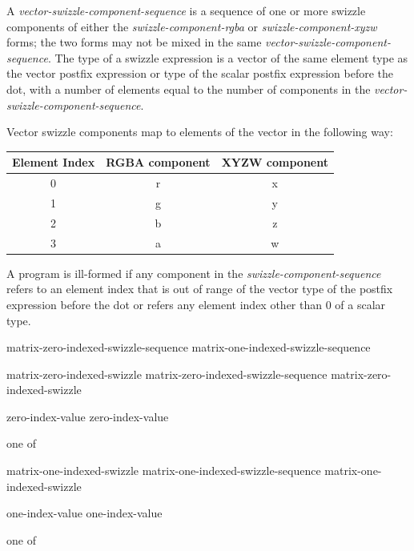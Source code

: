 \p A \textit{vector-swizzle-component-sequence} is a sequence of one or more
swizzle components of either the \textit{swizzle-component-rgba} or
\textit{swizzle-component-xyzw} forms; the two forms may not be mixed in the
same \textit{vector-swizzle-component-sequence}. The type of a swizzle
expression is a vector of the same element type as the vector postfix
expression or type of the scalar postfix expression before the dot, with a
number of elements equal to the number of components in the
\textit{vector-swizzle-component-sequence}.

\p Vector swizzle components map to elements of the vector in the following way:

\begin{center}
  \begin{tabular}{|| c | c | c ||}
    \hline
    Element Index & RGBA component & XYZW component \\
    \hline
    0 & r & x \\
    1 & g & y \\
    2 & b & z \\
    3 & a & w \\
    \hline
  \end{tabular}
\end{center}

\p A program is ill-formed if any component in the
\textit{swizzle-component-sequence} refers to an element index that is out of
range of the vector type of the postfix expression before the dot or refers any
element index other than 0 of a scalar type.

\begin{grammar}
  \br
  matrix-zero-indexed-swizzle-sequence\br
  matrix-one-indexed-swizzle-sequence\br

  \br
  matrix-zero-indexed-swizzle\br
  matrix-zero-indexed-swizzle-sequence matrix-zero-indexed-swizzle\br

  \br
   zero-index-value zero-index-value\br

   \textnormal{one of}\br
  \br

  \br
  matrix-one-indexed-swizzle\br
  matrix-one-indexed-swizzle-sequence matrix-one-indexed-swizzle\br

  \br
  \terminal{\_} one-index-value one-index-value\br

   \textnormal{one of}\br
  \br
\end{grammar}

